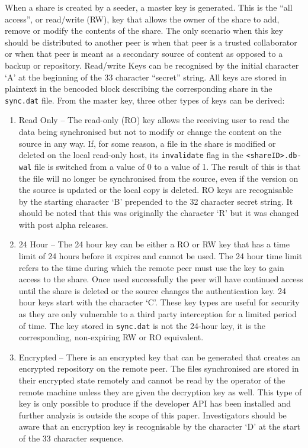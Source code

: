 \documentclass[final,5p,times,twocolumn]{elsarticle}
\begin{document}
When a share is created by a seeder, a master key is generated. This is the ``all access'', or read/write (RW), key that allows the owner of the share to add, remove or modify the contents of the share. The only scenario when this key should be distributed to another peer is when that peer is a trusted collaborator or when that peer is meant as a secondary source of content as opposed to a backup or repository. Read/write Keys can be recognised by the initial character `A' at the beginning of the 33 character ``secret'' string. All keys are stored in plaintext in the bencoded block describing the corresponding share in the \texttt{sync.dat} file. From the master key, three other types of keys can be derived:
\begin{enumerate}
\item Read Only -- The read-only (RO) key allows the receiving user to read the data being synchronised but not to modify or change the content on the source in any way. If, for some reason, a file in the share is modified or deleted on the local read-only host, its \texttt{invalidate} flag in the \texttt{<shareID>.db-wal} file is switched from a value of 0 to a value of 1. The result of this is that the file will no longer be synchronised from the source, even if the version on the source is updated or the local copy is deleted. RO keys are recognisable by the starting character `B' prepended to the 32 character secret string. It should be noted that this was originally the character `R' but it was changed with post alpha releases.
 
\item 24 Hour -- The 24 hour key can be either a RO or RW key that has a time limit of 24 hours before it expires and cannot be used. The 24 hour time limit refers to the time during which the remote peer must use the key to gain access to the share. Once used successfully the peer will have continued access until the share is deleted or the source changes the authentication key. 24 hour keys start with the character `C'. These key types are useful for security as they are only vulnerable to a third party interception for a limited period of time. The key stored in \texttt{sync.dat} is not the 24-hour key, it is the corresponding, non-expiring RW or RO equivalent.
 
 \item Encrypted -- There is an encrypted key that can be generated that creates an encrypted repository on the remote peer. The files synchronised are stored in their encrypted state remotely and cannot be read by the operator of the remote machine unless they are given the decryption key as well. This type of key is only possible to produce if the developer API has been installed and further analysis is outside the scope of this paper. Investigators should be aware that an encryption key is recognisable by the character `D' at the start of the 33 character sequence.
\end{enumerate}
 
\end{document}
